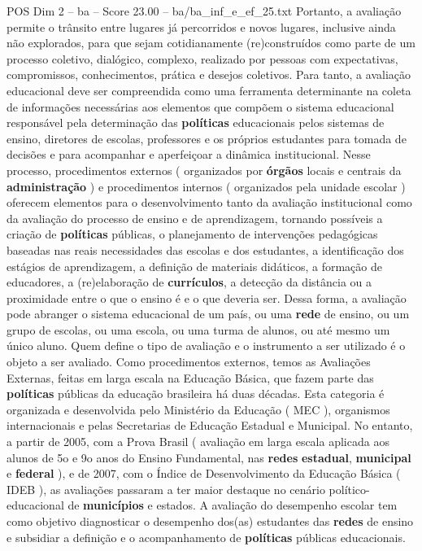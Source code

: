 \begin{textsample}{POS Dim 2 – ba – Score 23.00 – ba/ba\_inf\_e\_ef\_25.txt}
Portanto, a avaliação permite o trânsito entre lugares já percorridos e novos lugares, inclusive ainda não explorados, para que sejam cotidianamente (re)construídos como parte de um processo coletivo, dialógico, complexo, realizado por pessoas com expectativas, compromissos, conhecimentos, prática e desejos coletivos.
Para tanto, a avaliação educacional deve ser compreendida como uma ferramenta determinante na coleta de informações necessárias aos elementos que compõem o sistema educacional responsável pela determinação das \textbf{políticas} educacionais pelos sistemas de ensino, diretores de escolas, professores e os próprios estudantes para tomada de decisões e para acompanhar e aperfeiçoar a dinâmica institucional.
Nesse processo, procedimentos externos ( organizados por \textbf{órgãos} locais e centrais da \textbf{administração} ) e procedimentos internos ( organizados pela unidade escolar ) oferecem elementos para o desenvolvimento tanto da avaliação institucional como da avaliação do processo de ensino e de aprendizagem, tornando possíveis a criação de \textbf{políticas} públicas, o planejamento de intervenções pedagógicas baseadas nas reais necessidades das escolas e dos estudantes, a identificação dos estágios de aprendizagem, a definição de materiais didáticos, a formação de educadores, a (re)elaboração de \textbf{currículos}, a detecção da distância ou a proximidade entre o que o ensino é e o que deveria ser.
Dessa forma, a avaliação pode abranger o sistema educacional de um país, ou uma \textbf{rede} de ensino, ou um grupo de escolas, ou uma escola, ou uma turma de alunos, ou até mesmo um único aluno.
Quem define o tipo de avaliação e o instrumento a ser utilizado é o objeto a ser avaliado.
Como procedimentos externos, temos as Avaliações Externas, feitas em larga escala na Educação Básica, que fazem parte das \textbf{políticas} públicas da educação brasileira há duas décadas.
Esta categoria é organizada e desenvolvida pelo Ministério da Educação ( MEC ), organismos internacionais e pelas Secretarias de Educação Estadual e Municipal.
No entanto, a partir de 2005, com a Prova Brasil ( avaliação em larga escala aplicada aos alunos de 5o e 9o anos do Ensino Fundamental, nas \textbf{redes} \textbf{estadual}, \textbf{municipal} e \textbf{federal} ), e de 2007, com o Índice de Desenvolvimento da Educação Básica ( IDEB ), as avaliações passaram a ter maior destaque no cenário político-educacional de \textbf{municípios} e estados.
A avaliação do desempenho escolar tem como objetivo diagnosticar o desempenho dos(as) estudantes das \textbf{redes} de ensino e subsidiar a definição e o acompanhamento de \textbf{políticas} públicas educacionais.

\end{textsample}
